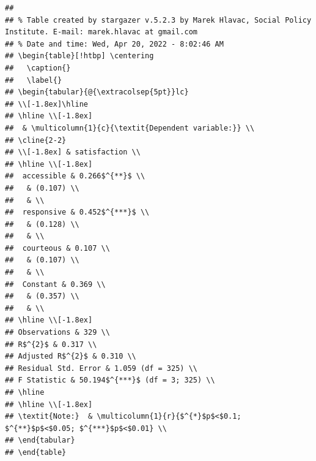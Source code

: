 \documentclass[
]{article}
\begin{document}
\begin{verbatim}
## 
## % Table created by stargazer v.5.2.3 by Marek Hlavac, Social Policy Institute. E-mail: marek.hlavac at gmail.com
## % Date and time: Wed, Apr 20, 2022 - 8:02:46 AM
## \begin{table}[!htbp] \centering 
##   \caption{} 
##   \label{} 
## \begin{tabular}{@{\extracolsep{5pt}}lc} 
## \\[-1.8ex]\hline 
## \hline \\[-1.8ex] 
##  & \multicolumn{1}{c}{\textit{Dependent variable:}} \\ 
## \cline{2-2} 
## \\[-1.8ex] & satisfaction \\ 
## \hline \\[-1.8ex] 
##  accessible & 0.266$^{**}$ \\ 
##   & (0.107) \\ 
##   & \\ 
##  responsive & 0.452$^{***}$ \\ 
##   & (0.128) \\ 
##   & \\ 
##  courteous & 0.107 \\ 
##   & (0.107) \\ 
##   & \\ 
##  Constant & 0.369 \\ 
##   & (0.357) \\ 
##   & \\ 
## \hline \\[-1.8ex] 
## Observations & 329 \\ 
## R$^{2}$ & 0.317 \\ 
## Adjusted R$^{2}$ & 0.310 \\ 
## Residual Std. Error & 1.059 (df = 325) \\ 
## F Statistic & 50.194$^{***}$ (df = 3; 325) \\ 
## \hline 
## \hline \\[-1.8ex] 
## \textit{Note:}  & \multicolumn{1}{r}{$^{*}$p$<$0.1; $^{**}$p$<$0.05; $^{***}$p$<$0.01} \\ 
## \end{tabular} 
## \end{table}
\end{verbatim}
\end{document}
